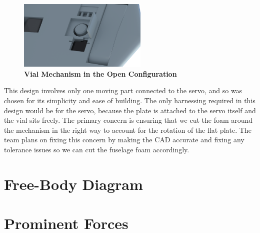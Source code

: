     \begin{figure}[H]
        \centering
        \includegraphics[width=0.55\textwidth]{homeworks/homework4/report/Figure/aircraft_assembly_door_open.png}
        \caption{\textbf{Vial Mechanism in the Open Configuration}}
        \label{fig:vial_open}
    \end{figure}
    
    This design involves only one moving part connected to the servo, and so was chosen for its simplicity and ease of building. The only harnessing required in this design would be for the servo, because the plate is attached to the servo itself and the vial sits freely. The primary concern is ensuring that we cut the foam around the mechanism in the right way to account for the rotation of the flat plate. The team plans on fixing this concern by making the CAD accurate and fixing any tolerance issues so we can cut the fuselage foam accordingly.
    
\section{Free-Body Diagram}

\section{Prominent Forces}

